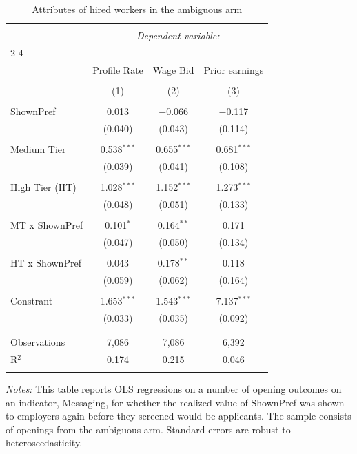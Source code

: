 
\begin{table}[!htbp] \centering 
  \caption{Attributes of hired workers in the ambiguous arm} 
  \label{tab:hired_workers} 
\begin{tabular}{@{\extracolsep{5pt}}lccc} 
\\[-1.8ex]\hline 
\hline \\[-1.8ex] 
 & \multicolumn{3}{c}{\textit{Dependent variable:}} \\ 
\cline{2-4} 
\\[-1.8ex] & Profile Rate & Wage Bid & Prior earnings \\ 
\\[-1.8ex] & (1) & (2) & (3)\\ 
\hline \\[-1.8ex] 
 ShownPref & 0.013 & $-$0.066 & $-$0.117 \\ 
  & (0.040) & (0.043) & (0.114) \\ 
  & & & \\ 
 Medium Tier & 0.538$^{***}$ & 0.655$^{***}$ & 0.681$^{***}$ \\ 
  & (0.039) & (0.041) & (0.108) \\ 
  & & & \\ 
 High Tier (HT) & 1.028$^{***}$ & 1.152$^{***}$ & 1.273$^{***}$ \\ 
  & (0.048) & (0.051) & (0.133) \\ 
  & & & \\ 
 MT x ShownPref & 0.101$^{*}$ & 0.164$^{**}$ & 0.171 \\ 
  & (0.047) & (0.050) & (0.134) \\ 
  & & & \\ 
 HT x ShownPref & 0.043 & 0.178$^{**}$ & 0.118 \\ 
  & (0.059) & (0.062) & (0.164) \\ 
  & & & \\ 
 Constrant & 1.653$^{***}$ & 1.543$^{***}$ & 7.137$^{***}$ \\ 
  & (0.033) & (0.035) & (0.092) \\ 
  & & & \\ 
\hline \\[-1.8ex] 
Observations & 7,086 & 7,086 & 6,392 \\ 
R$^{2}$ & 0.174 & 0.215 & 0.046 \\ 
\hline 
\hline \\[-1.8ex] 
\end{tabular}
\begin{minipage}{0.9\linewidth} 
 \emph{Notes:} This table reports OLS regressions on a number of opening outcomes on an indicator, Messaging, for whether the realized value of ShownPref was shown to employers again before they screened would-be applicants.
The sample consists of openings from the ambiguous arm.
\ambigdef
\shownprefdef
\tierdef
Standard errors are robust to heteroscedasticity.  \starlanguage
 \end{minipage}
\end{table}
